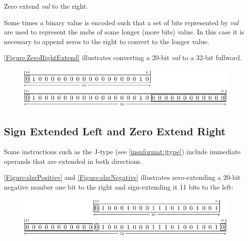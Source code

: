 Zero extend {\em val} to the right.

Some times a binary value is encoded such that a set of bits represented
by {\em val} are used to represent the \acrshort{msb}s of some longer (more bits)
value.
In this case it is necessary to append zeros to the right to convert \verb@val@ to
the longer value.

\autoref{Figure:ZeroRightExtend} illustrates converting a 20-bit {\em val} to
a 32-bit fullword.

\begin{figure}[ht]
  \centering
  \includegraphics{figures/chapter05/ZeroRightExtend.pdf}
  \label{Figure:ZeroRightExtend}
\end{figure}



\subsection{Sign Extended Left and Zero Extend Right}
\label{extension:slzr}

Some instructions such as the J-type (see \autoref{insnformat:jtype}) include
immediate operands that are extended in both directions.

\autoref{Figure:slzrPositive} and \autoref{Figure:slzrNegative}
illustrates zero-extending a 20-bit negative number one bit to the right
and sign-extending it 11 bits to the left:

\begin{figure}[ht]
  \centering
  \includegraphics{figures/chapter05/slzrPositive.pdf}
  \label{Figure:slzrPositive}
\end{figure}

